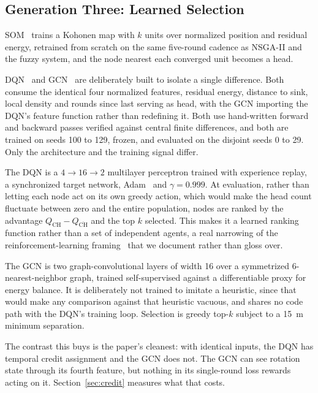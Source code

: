 \subsection{Generation Three: Learned Selection}

SOM~\cite{kohonen1990som} trains a Kohonen map with $k$ units over normalized
position and residual energy, retrained from scratch on the same five-round
cadence as NSGA-II and the fuzzy system, and the node nearest each converged
unit becomes a head.

DQN~\cite{mnih2015dqn,watkins1992qlearning} and GCN~\cite{kipf2017gcn} are
deliberately built to isolate a single difference. Both consume the identical
four normalized features, residual energy, distance to sink, local density and
rounds since last serving as head, with the GCN importing the DQN's feature
function rather than redefining it. Both use hand-written forward and backward
passes verified against central finite differences, and both are trained on
seeds 100 to 129, frozen, and evaluated on the disjoint seeds 0 to 29. Only the
architecture and the training signal differ.

The DQN is a $4 \rightarrow 16 \rightarrow 2$ multilayer perceptron trained with
experience replay, a synchronized target network, Adam~\cite{kingma2015adam} and
$\gamma = 0.999$. At evaluation, rather than letting each node act on its own
greedy action, which would make the head count fluctuate between zero and the
entire population, nodes are ranked by the advantage
$Q_{\mathrm{CH}} - Q_{\overline{\mathrm{CH}}}$ and the top $k$ selected. This
makes it a learned ranking function rather than a set of independent agents, a
real narrowing of the reinforcement-learning framing~\cite{luong2019drl} that we
document rather than gloss over.

The GCN is two graph-convolutional layers of width 16 over a symmetrized
6-nearest-neighbor graph, trained self-supervised against a differentiable proxy
for energy balance. It is deliberately not trained to imitate a heuristic, since
that would make any comparison against that heuristic vacuous, and shares no
code path with the DQN's training loop. Selection is greedy top-$k$ subject to a
15~m minimum separation.

The contrast this buys is the paper's cleanest: with identical inputs, the DQN
has temporal credit assignment and the GCN does not. The GCN can see rotation
state through its fourth feature, but nothing in its single-round loss rewards
acting on it. Section~\ref{sec:credit} measures what that costs.

